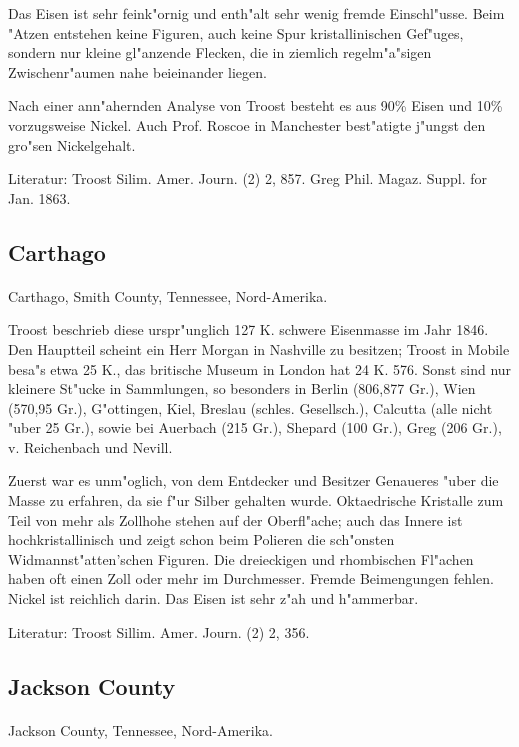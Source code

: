 \documentclass[a4paper, 11pt, oneside]{article}
\begin{document}
Das Eisen ist sehr feink"ornig und enth"alt sehr wenig fremde Einschl"usse. Beim "Atzen entstehen keine Figuren, auch keine Spur kristallinischen Gef"uges, sondern nur kleine gl"anzende Flecken, die in ziemlich regelm"a"sigen Zwischenr"aumen nahe beieinander liegen.

Nach einer ann"ahernden Analyse von Troost besteht es aus 90\% Eisen und 10\% vorzugsweise Nickel. Auch Prof. Roscoe in Manchester best"atigte j"ungst den gro"sen Nickelgehalt.

\footnotesize
Literatur: Troost Silim. Amer. Journ. (2) 2, 857. Greg Phil. Magaz. Suppl. for Jan. 1863.

\subsection{Carthago}
\normalsize
\paragraph{}
Carthago, Smith County, Tennessee, Nord-Amerika.

Troost beschrieb diese urspr"unglich 127 K. schwere Eisenmasse im Jahr 1846. Den Hauptteil scheint ein Herr Morgan in Nashville zu besitzen; Troost in Mobile besa"s etwa 25 K., das britische Museum in London hat 24 K. 576. Sonst sind nur kleinere St"ucke in Sammlungen, so besonders in Berlin (806,877 Gr.), Wien (570,95 Gr.), G"ottingen, Kiel, Breslau (schles. Gesellsch.), Calcutta (alle nicht "uber 25 Gr.), sowie bei Auerbach (215 Gr.), Shepard (100 Gr.), Greg (206 Gr.), v. Reichenbach und Nevill.

Zuerst war es unm"oglich, von dem Entdecker und Besitzer Genaueres "uber die Masse zu erfahren, da sie f"ur Silber gehalten wurde. Oktaedrische Kristalle zum Teil von mehr als Zollhohe stehen auf der Oberfl"ache; auch das Innere ist hochkristallinisch und zeigt schon beim Polieren die sch"onsten Widmannst"atten'schen Figuren. Die dreieckigen und rhombischen Fl"achen haben oft einen Zoll oder mehr im Durchmesser. Fremde Beimengungen fehlen. Nickel ist reichlich darin. Das Eisen ist sehr z"ah und h"ammerbar.

\footnotesize
Literatur: Troost Sillim. Amer. Journ. (2) 2, 356.

\subsection{Jackson County}
\normalsize
\paragraph{}
Jackson County, Tennessee, Nord-Amerika.
\end{document}
